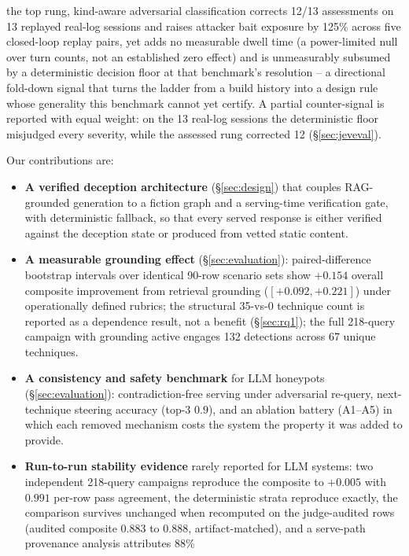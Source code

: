 \begin{itemize}
the top rung, kind-aware adversarial classification corrects 12/13
assessments on 13 replayed real-log sessions and raises attacker bait
exposure by 125\% across five closed-loop replay pairs, yet adds no
measurable dwell time (a power-limited null over turn counts, not an
established zero effect) and is unmeasurably subsumed by a deterministic
decision floor at that benchmark's resolution -- a directional
fold-down signal that turns the ladder from a build history into a
design rule whose generality this benchmark cannot yet certify. A
partial counter-signal is reported with equal weight: on the 13 real-log
sessions the deterministic floor misjudged every severity, while the
assessed rung corrected 12 (\S\ref{sec:jeveval}).
\end{itemize}

\noindent Our contributions are:
\begin{itemize}
\item \textbf{A verified deception architecture} (\S\ref{sec:design}) that
couples RAG-grounded generation to a fiction graph and a serving-time
verification gate, with deterministic fallback, so that every served
response is either verified against the deception state or produced from
vetted static content.
\item \textbf{A measurable grounding effect} (\S\ref{sec:evaluation}):
paired-difference bootstrap intervals over identical 90-row scenario
sets show $+0.154$ overall composite improvement from retrieval
grounding ($[+0.092, +0.221]$) under operationally defined rubrics; the
structural 35-vs-0 technique count is reported as a dependence result,
not a benefit (\S\ref{sec:rq1}); the full 218-query campaign with
grounding active engages 132 detections across 67 unique techniques.
\item \textbf{A consistency and safety benchmark} for LLM honeypots
(\S\ref{sec:evaluation}): contradiction-free serving under adversarial
re-query, next-technique steering accuracy (top-3 $0.9$), and an ablation
battery (A1--A5) in which each removed mechanism costs the system the
property it was added to provide.
\item \textbf{Run-to-run stability evidence} rarely reported for LLM
systems: two independent 218-query campaigns reproduce the composite to
$+0.005$ with $0.991$ per-row pass agreement, the deterministic
strata reproduce exactly, the comparison survives unchanged when
recomputed on the judge-audited rows (audited composite 0.883 to 0.888,
artifact-matched), and a serve-path provenance analysis attributes 88\%

\end{itemize}
